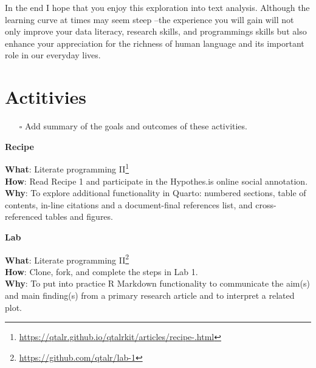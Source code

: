 \documentclass[
  letterpaper,
]{latex/krantz}
\providecommand{\tightlist}{%
  \setlength{\itemsep}{0pt}\setlength{\parskip}{0pt}}\usepackage{longtable,booktabs,array}
\DeclareRobustCommand{\href}[2]{#2\footnote{\url{#1}}}
\begin{document}
In the end I hope that you enjoy this exploration into text analysis.
Although the learning curve at times may seem steep --the experience you
will gain will not only improve your data literacy, research skills, and
programmings skills but also enhance your appreciation for the richness
of human language and its important role in our everyday lives.

\hypertarget{actitivies}{%
\section*{Actitivies}\label{actitivies}}


\begin{itemize}
\tightlist
\item[$\square$]
  Add summary of the goals and outcomes of these activities.
\end{itemize}

\begin{tcolorbox}[enhanced jigsaw, arc=.35mm, leftrule=.75mm, rightrule=.15mm, opacityback=0, colback=white, breakable, bottomrule=.15mm, left=2mm, toprule=.15mm]

\textbf{ Recipe}

\textbf{What}:
\href{https://qtalr.github.io/qtalrkit/articles/recipe-.html}{Literate
programming II}\\
\textbf{How}: Read Recipe 1 and participate in the Hypothes.is online
social annotation.\\
\textbf{Why}: To explore additional functionality in Quarto: numbered
sections, table of contents, in-line citations and a document-final
references list, and cross-referenced tables and figures.

\end{tcolorbox}

\begin{tcolorbox}[enhanced jigsaw, arc=.35mm, leftrule=.75mm, rightrule=.15mm, opacityback=0, colback=white, breakable, bottomrule=.15mm, left=2mm, toprule=.15mm]

\textbf{ Lab}

\textbf{What}: \href{https://github.com/qtalr/lab-1}{Literate
programming II}\\
\textbf{How}: Clone, fork, and complete the steps in Lab 1.\\
\textbf{Why}: To put into practice R Markdown functionality to
communicate the aim(s) and main finding(s) from a primary research
article and to interpret a related plot.

\end{tcolorbox}
\end{document}
